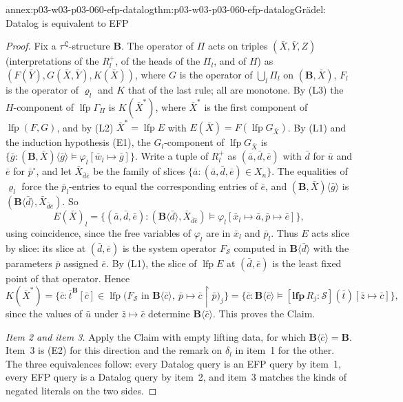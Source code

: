 \begin{annexitem}{annex:p03-w03-p03-060-efp-datalog}{thm:p03-w03-p03-060-efp-datalog}{Gr\"adel: Datalog is equivalent to EFP}
\begin{proof}
Fix a \(\tau^{\mathfrak L}\)-structure \(\mathbf B\). The operator of
\(\Pi\) acts on triples \((\bar X,\bar Y,Z)\) (interpretations of the
\(R_l^+\), of the heads of the \(\Pi_l\), and of \(H\)) as
\((F(\bar Y),G(\bar X,\bar Y),K(\bar X))\), where \(G\) is the operator of
\(\bigcup_l\Pi_l\) on \((\mathbf B,\bar X)\), \(F_l\) is the operator of
\(\varrho_l\) and \(K\) that of the last rule; all are monotone. By (L3)
the \(H\)-component of \(\operatorname{lfp}\Gamma_\Pi\) is \(K(\bar X^\ast)\),
where \(\bar X^\ast\) is the first component of
\(\operatorname{lfp}(F,G)\), and by (L2) \(\bar X^\ast=\operatorname{lfp}E\)
with \(E(\bar X)=F(\operatorname{lfp}G_{\bar X})\). By (L1) and the
induction hypothesis (E1), the \(G_l\)-component of
\(\operatorname{lfp}G_{\bar X}\) is
\(\{\bar g:(\mathbf B,\bar X)\langle\bar g\rangle\models\varphi_l[\bar w_l\mapsto\bar g]\}\).
Write a tuple of \(R_l^+\) as \((\bar a,\bar d,\bar e)\) with \(\bar d\) for
\(\bar u\) and \(\bar e\) for \(\bar p^\circ\), and let
\(\bar X_{\bar d\bar e}\) be the family of slices
\(\{\bar a:(\bar a,\bar d,\bar e)\in X_n\}\). The equalities of
\(\varrho_l\) force the \(\bar p_l\)-entries to equal the corresponding
entries of \(\bar e\), and \((\mathbf B,\bar X)\langle\bar g\rangle\) is
\((\mathbf B\langle\bar d\rangle,\bar X_{\bar d\bar e})\). So
\[
 E(\bar X)_l=\{(\bar a,\bar d,\bar e):(\mathbf B\langle\bar d\rangle,\bar X_{\bar d\bar e})\models\varphi_l[\bar x_l\mapsto\bar a,\bar p\mapsto\bar e]\},
\]
using coincidence, since the free variables of \(\varphi_l\) are in
\(\bar x_l\) and \(\bar p_l\). Thus \(E\) acts slice by slice: its slice
at \((\bar d,\bar e)\) is the system operator \(F_{\mathcal S}\) computed in
\(\mathbf B\langle\bar d\rangle\) with the parameters \(\bar p\) assigned
\(\bar e\). By (L1), the slice of \(\operatorname{lfp}E\) at
\((\bar d,\bar e)\) is the least fixed point of that operator. Hence
\[
 K(\bar X^\ast)=\{\bar c:\bar t^{\mathbf B}[\bar c]\in\operatorname{lfp}\bigl(F_{\mathcal S}\text{ in }\mathbf B\langle\bar c\rangle,\ \bar p\mapsto\bar c\restriction\bar p\bigr)_j\}
 =\{\bar c:\mathbf B\langle\bar c\rangle\models[\mathbf{lfp}\,R_j:\mathcal S](\bar t)[\bar z\mapsto\bar c]\},
\]
since the values of \(\bar u\) under \(\bar z\mapsto\bar c\) determine
\(\mathbf B\langle\bar c\rangle\). This proves the Claim.

\emph{Item 2 and item 3.} Apply the Claim with empty lifting data, for
which \(\mathbf B\langle\bar c\rangle=\mathbf B\). Item~3 is (E2) for this
direction and the remark on \(\delta_l\) in item~1 for the other. The
three equivalences follow: every Datalog query is an EFP query by item~1,
every EFP query is a Datalog query by item~2, and item~3 matches the
kinds of negated literals on the two sides.
\end{proof}
\end{annexitem}

